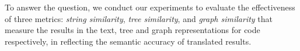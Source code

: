 %
%
To answer the question, we conduct our experiments to evaluate the
effectiveness of three metrics: \textit{string similarity},
\textit{tree similarity}, and \textit{graph similarity} that measure
the results in the text, tree and graph representations for code
respectively, in reflecting the semantic accuracy of translated
results.


 

